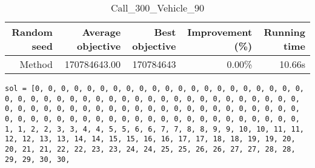 \begin{table}[ht]
\centering
\caption{Call\_300\_Vehicle\_90}
\label{tab:call300vehicle90}
\begin{tabular}{|r|r|r|r|r|}
Random seed & Average objective & Best objective & Improvement (\%) & Running time \\
\hline
Method & 170784643.00 & 170784643 & 0.00\% & 10.66s\\
\end{tabular}
\end{table}
\begin{lstlisting}[label={lst:call300vehicle90},caption=Optimal solution call\_300\_vehicle\_90]
sol = [0, 0, 0, 0, 0, 0, 0, 0, 0, 0, 0, 0, 0, 0, 0, 0, 0, 0, 0, 0, 0, 0, 0, 0, 0, 0, 0, 0, 0, 0, 0, 0, 0, 0, 0, 0, 0, 0, 0, 0, 0, 0, 0, 0, 0, 0, 0, 0, 0, 0, 0, 0, 0, 0, 0, 0, 0, 0, 0, 0, 0, 0, 0, 0, 0, 0, 0, 0, 0, 0, 0, 0, 0, 0, 0, 0, 0, 0, 0, 0, 0, 0, 0, 0, 0, 0, 0, 0, 0, 0, 1, 1, 2, 2, 3, 3, 4, 4, 5, 5, 6, 6, 7, 7, 8, 8, 9, 9, 10, 10, 11, 11, 12, 12, 13, 13, 14, 14, 15, 15, 16, 16, 17, 17, 18, 18, 19, 19, 20, 20, 21, 21, 22, 22, 23, 23, 24, 24, 25, 25, 26, 26, 27, 27, 28, 28, 29, 29, 30, 30,

\end{lstlisting}
